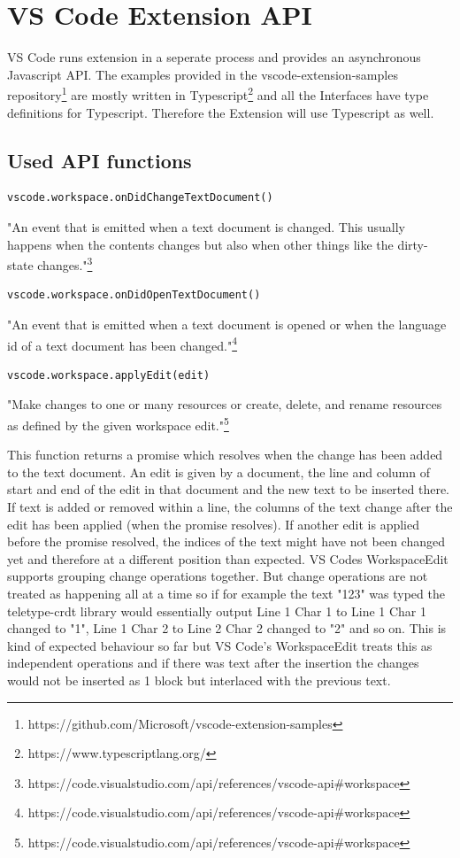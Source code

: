 \section{VS Code Extension API}

VS Code runs extension in a seperate process and provides an asynchronous Javascript API.
The examples provided in the vscode-extension-samples repository\footnote{https://github.com/Microsoft/vscode-extension-samples} are mostly written in Typescript\footnote{https://www.typescriptlang.org/} and all the Interfaces have type definitions for Typescript.
Therefore the Extension will use Typescript as well.

\subsection{Used API functions}

\begin{lstlisting}
vscode.workspace.onDidChangeTextDocument()
\end{lstlisting}

"An event that is emitted when a text document is changed. This usually happens when the contents changes but also when other things like the dirty-state changes."\footnote{https://code.visualstudio.com/api/references/vscode-api\#workspace}

\begin{lstlisting}
vscode.workspace.onDidOpenTextDocument()
\end{lstlisting}

"An event that is emitted when a text document is opened or when the language id of a text document has been changed."\footnote{https://code.visualstudio.com/api/references/vscode-api\#workspace}

\begin{lstlisting}
vscode.workspace.applyEdit(edit)
\end{lstlisting}
"Make changes to one or many resources or create, delete, and rename resources as defined by the given workspace edit."\footnote{https://code.visualstudio.com/api/references/vscode-api\#workspace}

This function returns a promise which resolves when the change has been added to the text document.
An edit is given by a document, the line and column of start and end of the edit in that document and the new text to be inserted there.
If text is added or removed within a line, the columns of the text change after the edit has been applied (when the promise resolves). If another edit is applied before the promise resolved, the indices of the text might have not been changed yet and therefore at a different position than expected. VS Codes WorkspaceEdit supports grouping change operations together. But change operations are not treated as happening all at a time so if for example the text "123" was typed the teletype-crdt library would essentially output Line 1 Char 1 to Line 1 Char 1 changed to "1", Line 1 Char 2 to Line 2 Char 2 changed to "2" and so on. This is kind of expected behaviour so far but VS Code's WorkspaceEdit treats this as independent operations and if there was text after the insertion the changes would not be inserted as 1 block but interlaced with the previous text. 

